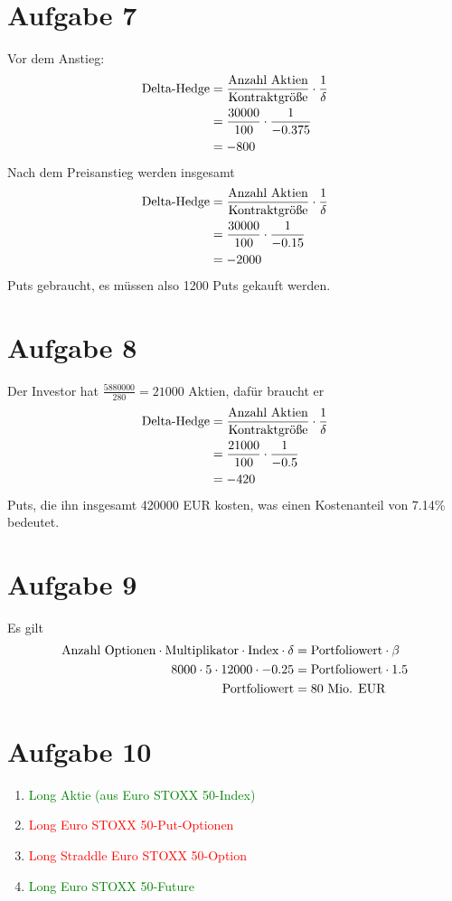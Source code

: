 \documentclass{article}
\begin{document}
	\section*{Aufgabe 7}
	Vor dem Anstieg:
	\begin{align}
		\text{Delta-Hedge} &= \frac{\text{Anzahl Aktien}}{\text{Kontraktgröße}}\cdot\frac{1}{\delta} \notag \\
		&= \frac{30000}{100} \cdot \frac{1}{-0.375} \notag \\
		&= -800 \notag
	\end{align}
	Nach dem Preisanstieg werden insgesamt
	\begin{align}
		\text{Delta-Hedge} &= \frac{\text{Anzahl Aktien}}{\text{Kontraktgröße}}\cdot\frac{1}{\delta} \notag \\
		&= \frac{30000}{100} \cdot \frac{1}{-0.15} \notag \\
		&= -2000 \notag
	\end{align}
	Puts gebraucht, es müssen also 1200 Puts gekauft werden.
	
	\section*{Aufgabe 8}
	Der Investor hat $\frac{5880000}{280}=21000$ Aktien, dafür braucht er
	\begin{align}
		\text{Delta-Hedge} &= \frac{\text{Anzahl Aktien}}{\text{Kontraktgröße}}\cdot\frac{1}{\delta} \notag \\
		&= \frac{21000}{100} \cdot \frac{1}{-0.5} \notag \\
		&= -420 \notag
	\end{align}
	Puts, die ihn insgesamt 420000 EUR kosten, was einen Kostenanteil von 7.14\% bedeutet.
	
	\section*{Aufgabe 9}
	Es gilt
	\begin{align}
		\text{Anzahl Optionen} \cdot \text{Multiplikator} \cdot \text{Index} \cdot \delta &= \text{Portfoliowert} \cdot \beta \notag \\
		8000 \cdot 5 \cdot 12000\cdot -0.25 &= \text{Portfoliowert} \cdot 1.5 \notag \\
		\text{Portfoliowert} &= 80 \text{ Mio. EUR} \notag
	\end{align}
	
	\section*{Aufgabe 10}
	\begin{enumerate}[label=(\alph*)]
		\item\textcolor{green}{Long Aktie (aus Euro STOXX 50-Index)}
		\item\textcolor{red}{Long Euro STOXX 50-Put-Optionen}
		\item\textcolor{red}{Long Straddle Euro STOXX 50-Option}
		\item\textcolor{green}{Long Euro STOXX 50-Future}
	\end{enumerate}
	
\end{document}
